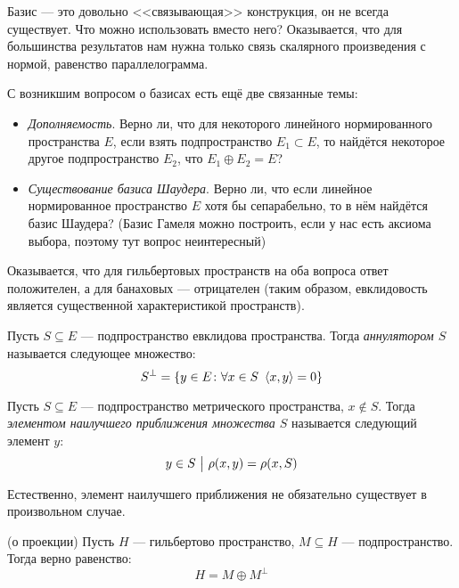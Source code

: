 \begin{note}
	Базис --- это довольно <<связывающая>> конструкция, он не всегда существует. Что можно использовать вместо него? Оказывается, что для большинства результатов нам нужна только связь скалярного произведения с нормой, равенство параллелограмма.
\end{note}

\begin{note}
	С возникшим вопросом о базисах есть ещё две связанные темы:
	\begin{itemize}
		\item \textit{Дополняемость}. Верно ли, что для некоторого линейного нормированного пространства $E$, если взять подпространство $E_1 \subset E$, то найдётся некоторое другое подпространство $E_2$, что $E_1 \oplus E_2 = E$?
		
		\item \textit{Существование базиса Шаудера}. Верно ли, что если линейное нормированное пространство $E$ хотя бы сепарабельно, то в нём найдётся базис Шаудера? (Базис Гамеля можно построить, если у нас есть аксиома выбора, поэтому тут вопрос неинтересный)
	\end{itemize}
	Оказывается, что для гильбертовых пространств на оба вопроса ответ положителен, а для банаховых --- отрицателен (таким образом, евклидовость является существенной характеристикой пространств).
\end{note}

\begin{definition}
	Пусть $S \subseteq E$ --- подпространство евклидова пространства. Тогда \textit{аннулятором $S$} называется следующее множество:
	\[
		S^\bot = \{y \in E \colon \forall x \in S\ \left\langle x, y\right\rangle = 0\}
	\]
\end{definition}

\begin{definition}
	Пусть $S \subseteq E$ --- подпространство метрического пространства, $x \notin S$. Тогда \textit{элементом наилучшего приближения множества $S$} называется следующий элемент $y$:
	\[
		y \in S \ \big|\  \rho(x, y) = \rho(x, S)
	\]
\end{definition}

\begin{note}
	Естественно, элемент наилучшего приближения не обязательно существует в произвольном случае.
\end{note}

\begin{theorem} (о проекции)
	Пусть $H$ --- гильбертово пространство, $M \subseteq H$ --- подпространство. Тогда верно равенство:
	\[
		H = M \oplus M^\bot
	\]
\end{theorem}

